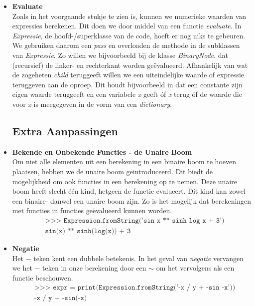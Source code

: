 \documentclass[12pt]{article}
\begin{document}
\begin{itemize}
\item \textbf{Evaluate}\\
Zoals in het voorgaande stukje te zien is, kunnen we numerieke waarden van expressies berekenen. Dit doen we door middel van een functie \textit{evaluate}. In \textit{Expressie}, de hoofd-/superklasse van de code, hoeft er nog niks te gebeuren. We gebruiken daarom een \textit{pass} en overloaden de methode in de subklassen van \textit{Expressie}. Zo willen we bijvoorbeeld bij de klasse \textit{BinaryNode}, dat (recursief) de linker- en rechterkant worden ge\"{e}valueerd. Afhankelijk van wat de zogeheten \textit{child} teruggeeft willen we een uiteindelijke waarde of expressie teruggeven aan de oproep. Dit houdt bijvoorbeeld in dat een constante zijn eigen waarde teruggeeft en een variabele \textit{x} geeft \'{o}f \textit{x} terug \'{o}f de waarde die voor \textit{x} is meegegeven in de vorm van een \textit{dictionary}.


\newpage
\subsection*{Extra Aanpassingen}

\item \textbf{Bekende en Onbekende Functies - de Unaire Boom} \\
Om niet alle elementen uit een berekening in een binaire boom te hoeven plaatsen, hebben we de unaire boom geintroduceerd. Dit biedt de mogelijkheid om ook functies in een berekening op te nemen. Deze unaire boom heeft slecht \'e\'en kind, hetgeen de functie evalueert. Dit kind kan zowel een binaire- danwel een unaire boom zijn. Zo is het mogelijk dat berekeningen met functies in functies ge\"evalueerd kunnen worden.
\begin{align*}
&\texttt{>>> Expression.fromString('sin x ** sinh log x + 3')}\\
&\texttt{sin(x) ** sinh(log(x)) + 3}
\end{align*}

\item \textbf{Negatie} \\
Het $-$ teken kent een dubbele betekenis. In het geval van \textit{negatie} vervangen we het $-$ teken in onze berekening door een $\sim$ om het vervolgens als een functie beschouwen. 
\begin{align*}
&\texttt{>>> expr =  print(Expression.fromString('-x / y + -sin -x'))}\\
&\texttt{-x / y + -sin(-x)}\\
\end{align*}
\end{itemize}
\end{document}
